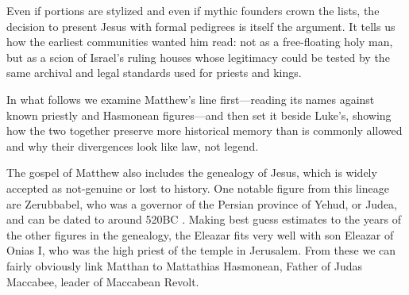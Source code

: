 Even if portions are stylized and even if mythic founders crown the lists, the decision to present Jesus with formal pedigrees is itself the argument.
It tells us how the earliest communities wanted him read: not as a free-floating holy man, but as a scion of Israel’s ruling houses whose legitimacy could be tested by the same archival and legal standards used for priests and kings.

In what follows we examine Matthew’s line first---reading its names against known priestly and Hasmonean figures---and then set it beside Luke’s, showing how the two together preserve more historical memory than is commonly allowed and why their divergences look like law, not legend.

The gospel of Matthew also includes the genealogy of Jesus, which is widely accepted as not-genuine or lost to history.
One notable figure from this lineage are Zerubbabel, who was a governor of the Persian province of Yehud, or Judea, and can be dated to around 520BC .
Making best guess estimates to the years of the other figures in the genealogy, the Eleazar fits very well with son Eleazar of Onias I, who was the high priest of the temple in Jerusalem.
From these we can fairly obviously link Matthan to Mattathias Hasmonean, Father of Judas Maccabee, leader of Maccabean Revolt.

